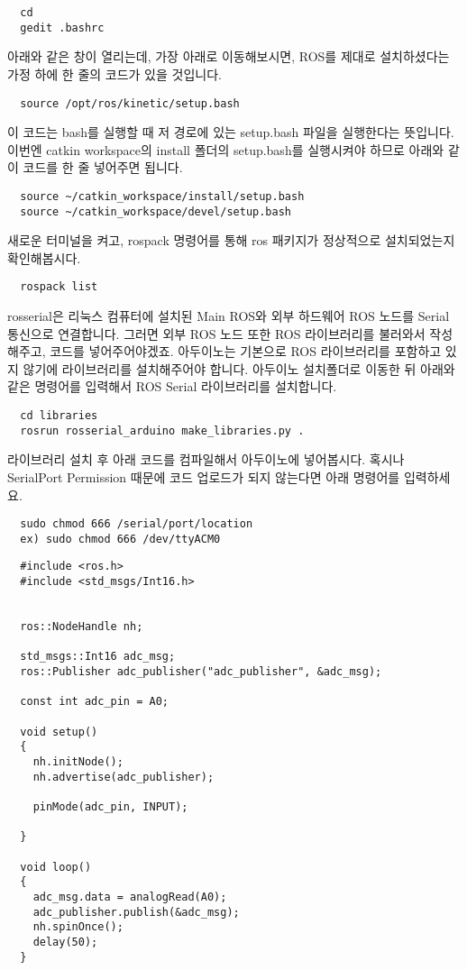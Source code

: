 \documentclass[11pt,fleqn]{book} %
\begin{document}
\begin{verbatim}
  cd
  gedit .bashrc
\end{verbatim}

아래와 같은 창이 열리는데, 가장 아래로 이동해보시면, ROS를 제대로 설치하셨다는 가정 하에 한 줄의 코드가 있을 것입니다.

\begin{verbatim}
  source /opt/ros/kinetic/setup.bash
\end{verbatim}

이 코드는 bash를 실행할 때 저 경로에 있는 setup.bash 파일을 실행한다는 뜻입니다.
이번엔 catkin workspace의 install 폴더의 setup.bash를 실행시켜야 하므로 아래와 같이 코드를 한 줄 넣어주면 됩니다.

\begin{verbatim}
  source ~/catkin_workspace/install/setup.bash
  source ~/catkin_workspace/devel/setup.bash
\end{verbatim}

새로운 터미널을 켜고, rospack 명령어를 통해 ros 패키지가 정상적으로 설치되었는지 확인해봅시다.

\begin{verbatim}
  rospack list
\end{verbatim}

rosserial은 리눅스 컴퓨터에 설치된 Main ROS와 외부 하드웨어 ROS 노드를 Serial 통신으로 연결합니다.
그러면 외부 ROS 노드 또한 ROS 라이브러리를 불러와서 작성해주고, 코드를 넣어주어야겠죠. 아두이노는 기본으로
ROS 라이브러리를 포함하고 있지 않기에 라이브러리를 설치해주어야 합니다.
아두이노 설치폴더로 이동한 뒤 아래와 같은 명령어를 입력해서 ROS Serial 라이브러리를 설치합니다.

\begin{verbatim}
  cd libraries
  rosrun rosserial_arduino make_libraries.py .
\end{verbatim}

라이브러리 설치 후 아래 코드를 컴파일해서 아두이노에 넣어봅시다. 혹시나 SerialPort Permission 때문에 코드 업로드가 되지 않는다면 아래 명령어를 입력하세요.

\begin{verbatim}
  sudo chmod 666 /serial/port/location
  ex) sudo chmod 666 /dev/ttyACM0
\end{verbatim}

\begin{verbatim}
  #include <ros.h>
  #include <std_msgs/Int16.h>


  ros::NodeHandle nh;

  std_msgs::Int16 adc_msg;
  ros::Publisher adc_publisher("adc_publisher", &adc_msg);

  const int adc_pin = A0;

  void setup()
  {
    nh.initNode();
    nh.advertise(adc_publisher);

    pinMode(adc_pin, INPUT);

  }

  void loop()
  {
    adc_msg.data = analogRead(A0);
    adc_publisher.publish(&adc_msg);
    nh.spinOnce();
    delay(50);
  }
\end{verbatim}
\end{document}
